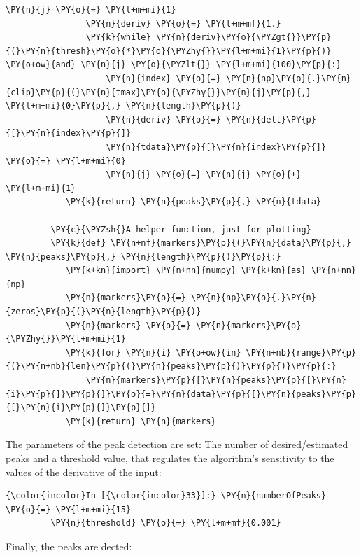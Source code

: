 \begin{Verbatim}[commandchars=\\\{\}]
         		\PY{n}{j} \PY{o}{=} \PY{l+m+mi}{1}
         		\PY{n}{deriv} \PY{o}{=} \PY{l+m+mf}{1.}
         		\PY{k}{while} \PY{n}{deriv}\PY{o}{\PYZgt{}}\PY{p}{(}\PY{n}{thresh}\PY{o}{*}\PY{o}{\PYZhy{}}\PY{l+m+mi}{1}\PY{p}{)} \PY{o+ow}{and} \PY{n}{j} \PY{o}{\PYZlt{}} \PY{l+m+mi}{100}\PY{p}{:}
         			\PY{n}{index} \PY{o}{=} \PY{n}{np}\PY{o}{.}\PY{n}{clip}\PY{p}{(}\PY{n}{tmax}\PY{o}{\PYZhy{}}\PY{n}{j}\PY{p}{,} \PY{l+m+mi}{0}\PY{p}{,} \PY{n}{length}\PY{p}{)}
         			\PY{n}{deriv} \PY{o}{=} \PY{n}{delt}\PY{p}{[}\PY{n}{index}\PY{p}{]}
         			\PY{n}{tdata}\PY{p}{[}\PY{n}{index}\PY{p}{]} \PY{o}{=} \PY{l+m+mi}{0}
         			\PY{n}{j} \PY{o}{=} \PY{n}{j} \PY{o}{+} \PY{l+m+mi}{1}
         	\PY{k}{return} \PY{n}{peaks}\PY{p}{,} \PY{n}{tdata}
         
         \PY{c}{\PYZsh{}A helper function, just for plotting}
         \PY{k}{def} \PY{n+nf}{markers}\PY{p}{(}\PY{n}{data}\PY{p}{,} \PY{n}{peaks}\PY{p}{,} \PY{n}{length}\PY{p}{)}\PY{p}{:}
         	\PY{k+kn}{import} \PY{n+nn}{numpy} \PY{k+kn}{as} \PY{n+nn}{np}
         	\PY{n}{markers}\PY{o}{=} \PY{n}{np}\PY{o}{.}\PY{n}{zeros}\PY{p}{(}\PY{n}{length}\PY{p}{)}
         	\PY{n}{markers} \PY{o}{=} \PY{n}{markers}\PY{o}{\PYZhy{}}\PY{l+m+mi}{1}
         	\PY{k}{for} \PY{n}{i} \PY{o+ow}{in} \PY{n+nb}{range}\PY{p}{(}\PY{n+nb}{len}\PY{p}{(}\PY{n}{peaks}\PY{p}{)}\PY{p}{)}\PY{p}{:}
         		\PY{n}{markers}\PY{p}{[}\PY{n}{peaks}\PY{p}{[}\PY{n}{i}\PY{p}{]}\PY{p}{]}\PY{o}{=}\PY{n}{data}\PY{p}{[}\PY{n}{peaks}\PY{p}{[}\PY{n}{i}\PY{p}{]}\PY{p}{]}
         	\PY{k}{return} \PY{n}{markers}		
\end{Verbatim}

    The parameters of the peak detection are set: The number of
desired/estimated peaks and a threshold value, that regulates the
algorithm's sensitivity to the values of the derivative of the input:

    \begin{Verbatim}[commandchars=\\\{\}]
{\color{incolor}In [{\color{incolor}33}]:} \PY{n}{numberOfPeaks} \PY{o}{=} \PY{l+m+mi}{15}
         \PY{n}{threshold} \PY{o}{=} \PY{l+m+mf}{0.001}
\end{Verbatim}

    Finally, the peaks are dected:


